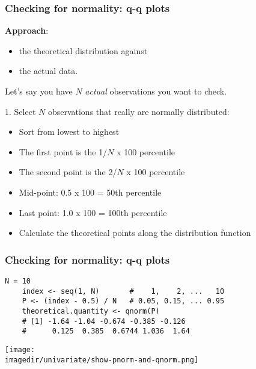 \begin{frame}\frametitle{Checking for normality: q-q plots}

	\textbf{Approach}: {\color{myOrange}{compare}}
	\begin{itemize}
		\item	the theoretical distribution against
		\item	the actual data. 
	\end{itemize}
	Let's say you have $N$ \emph{actual} observations you want to check.
	
	\vspace{16pt}
	1. Select $N$ observations that really are normally distributed:
	\begin{itemize}
		\item	Sort from lowest to highest
		\item	The first point is the 1/$N$ x 100 percentile
		\item	The second point is the 2/$N$ x 100 percentile
		\item	Mid-point: 0.5 x 100 = 50th percentile
		\item	Last point: 1.0 x 100 = 100th percentile
		\item	Calculate the theoretical points along the distribution function
	\end{itemize}
\end{frame}

\begin{frame}[fragile]\frametitle{Checking for normality: q-q plots}
	
	\begin{lstlisting}[R]
	N = 10
	index <- seq(1, N)       #    1,    2, ...   10
	P <- (index - 0.5) / N   # 0.05, 0.15, ... 0.95 
	theoretical.quantity <- qnorm(P)
	# [1] -1.64 -1.04 -0.674 -0.385 -0.126
	#      0.125  0.385  0.6744 1.036  1.64
	\end{lstlisting}
	\begin{center}
		\texttt{[image: \\imagedir/univariate/show-pnorm-and-qnorm.png]}
	\end{center}
\end{frame}

